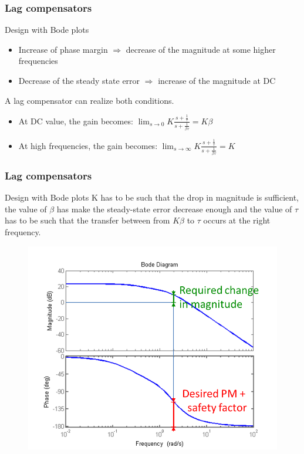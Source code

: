 \begin{frame}
	\frametitle{Lag compensators}
	\begin{block}{Design with Bode plots}
		\begin{itemize}
		\item Increase of phase margin $\Rightarrow$ decrease of the magnitude at some higher frequencies 
		\item Decrease of the steady state error $\Rightarrow$ increase of the magnitude at DC
		\end{itemize}
		A lag compensator can realize both conditions.
		\begin{itemize}
			\item At DC value, the gain becomes: $\lim_{s \to 0} K\frac{s + \frac{1}{\tau}}{s + \frac{1}{\beta\tau}} = K\beta$
			\item At high frequencies, the gain becomes:
			$\lim_{s \to \infty} K\frac{s + \frac{1}{\tau}}{s + \frac{1}{\beta\tau}} = K$ 
		\end{itemize}
	\end{block}
\end{frame}

\begin{frame}
	\frametitle{Lag compensators}
	\begin{block}{Design with Bode plots}
	K has to be such that the drop in magnitude is sufficient, the value of $\beta$ has make the steady-state error decrease enough and the value of $\tau$ has to be such that the transfer between from $K\beta$ to $\tau$ occurs at the right frequency.
	\begin{figure}
		\centering
		\includegraphics[width=0.45
		\linewidth]{determinationKLagcompensator}
	\end{figure}
	\end{block}
\end{frame}

